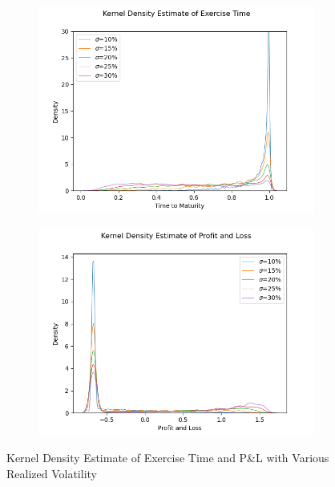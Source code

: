 \documentclass[12pt]{article}
\begin{document}
\begin{figure}[H]
  \centering
  \begin{subfigure}{.5\textwidth}
    \centering
    \includegraphics[width=\linewidth]{3b-ii-exercise_t.png}
  \end{subfigure}%
  \begin{subfigure}{.5\textwidth}
    \centering
    \includegraphics[width=\linewidth]{3b-ii-P&L.png}
  \end{subfigure}%
  \caption[]{Kernel Density Estimate of Exercise Time and P\&L with Various Realized Volatility}
\end{figure}
\end{document}
